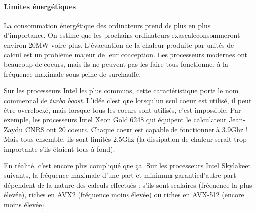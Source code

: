 
\paragraph{Limites énergétiques} La consommation énergétique des ordinateurs
prend de plus en plus d'importance. On estime que les prochains ordinateurs \og
exascale\fg consommeront environ 20MW voire plus. L'évacuation de la chaleur
produite par unités de calcul est un problème majeur de leur conception. Les
processeurs modernes ont beaucoup de coeurs, mais ils ne peuvent pas les faire
tous fonctionner à la fréquence maximale sous peine de surchauffe.

\begin{danger}
  Sur les processeurs Intel les plus communs, cette caractéristique porte le
  nom commercial de \og \textit{turbo boost}\fg. L'idée c'est que lorsqu'un seul
  coeur est utilisé, il peut être \og overclocké\fg, mais lorsque tous les
  coeurs sont utilisés, c'est impossible. Par exemple, les processeurs Intel
  Xeon Gold 6248 qui équipent le calculateur \og Jean-Zay\fg du CNRS ont 20
  coeurs. Chaque coeur est capable de fonctionner à 3.9Ghz ! Mais tous ensemble,
  ils sont limités 2.5Ghz (la dissipation de chaleur serait trop importante
  s'ils étaient tous à fond).
\end{danger}

\begin{ddanger}
  En réalité, c'est encore plus compliqué que ça. Sur les processeurs Intel \og
  Skylake\fg et suivants, la fréquence maximale d'une part et \og minimum
  garantie\fg d'autre part dépendent de la nature des calculs effectués : s'ils
  sont scalaires (fréquence la plus élevée), riches en AVX2 (fréquence moins
  élevée) ou riches en AVX-512 (encore moins élevée).
\end{ddanger}


